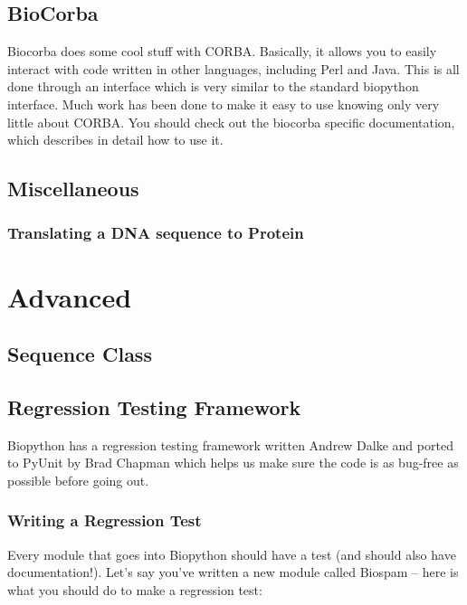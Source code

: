 \documentclass{report}
\begin{document}
\section{BioCorba}

Biocorba does some cool stuff with CORBA. Basically, it allows you to easily interact with code written in other languages, including Perl and Java. This is all done through an interface which is very similar to the standard biopython interface. Much work has been done to make it easy to use knowing only very little about CORBA. You should check out the biocorba specific documentation, which describes in detail how to use it.

\section{Miscellaneous}

\subsection{Translating a DNA sequence to Protein}

\chapter{Advanced}

\section{Sequence Class}

\section{Regression Testing Framework}
\label{sec:regr_test}

Biopython has a regression testing framework written Andrew Dalke and ported to PyUnit by Brad Chapman which helps us make sure the code is as bug-free as possible before going out.

\subsection{Writing a Regression Test}

Every module that goes into Biopython should have a test (and should also have documentation!). Let's say you've written a new module called Biospam -- here is what you should do to make a regression test:
\end{document}

